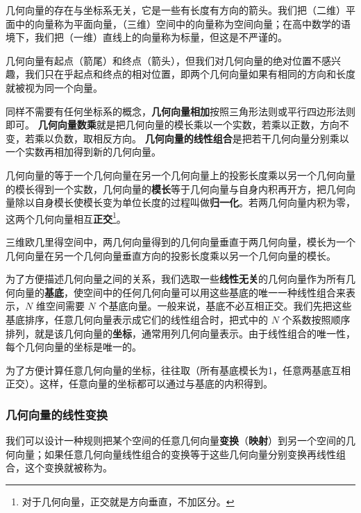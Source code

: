 几何向量的存在与坐标系无关，它是一些有长度有方向的箭头。我们把（二维）平面中的向量称为平面向量，（三维）空间中的向量称为空间向量；在高中数学的语境下，我们把（一维）直线上的向量称为标量，但这是不严谨的。



几何向量有起点（箭尾）和终点（箭头），但我们对几何向量的绝对位置不感兴趣，我们只在乎起点和终点的相对位置，即两个几何向量如果有相同的方向和长度就被视为同一个向量。

 同样不需要有任何坐标系的概念，\textbf{几何向量相加}按照三角形法则或平行四边形法则即可。
\textbf{几何向量数乘}就是把几何向量的模长乘以一个实数，若乘以正数，方向不变，若乘以负数，取相反方向。 \textbf{几何向量的线性组合}是把若干几何向量分别乘以一个实数再相加得到新的几何向量。

几何向量的等于一个几何向量在另一个几何向量上的投影长度乘以另一个几何向量的模长得到一个实数，几何向量的\textbf{模长}等于几何向量与自身内积再开方，把几何向量除以自身模长使模长变为单位长度的过程叫做\textbf{归一化}。若两几何向量内积为零，这两个几何向量相互\textbf{正交}\footnote{对于几何向量，正交就是方向垂直，不加区分。}。

三维欧几里得空间中，两几何向量得到的几何向量垂直于两几何向量，模长为一个几何向量在另一个几何向量垂直方向的投影长度乘以另一个几何向量的模长。

为了方便描述几何向量之间的关系，我们选取一些\textbf{线性无关}的几何向量作为所有几何向量的\textbf{基底}，使空间中的任何几何向量可以用这些基底的唯一一种线性组合来表示，$N$ 维空间需要 $N$ 个基底向量。一般来说，基底不必互相正交。我们先把这些基底排序，任意几何向量表示成它们的线性组合时，把式中的 $N$ 个系数按照顺序排列，就是该几何向量的\textbf{坐标}，通常用列几何向量表示。由于线性组合的唯一性，每个几何向量的坐标是唯一的。

为了方便计算任意几何向量的坐标，往往取（所有基底模长为1，任意两基底互相正交）。这样，任意向量的坐标都可以通过与基底的内积得到。


\subsubsection{几何向量的线性变换}

我们可以设计一种规则把某个空间的任意几何向量\textbf{变换}（\textbf{映射}）到另一个空间的几何向量；如果任意几何向量线性组合的变换等于这些几何向量分别变换再线性组合，这个变换就被称为。






